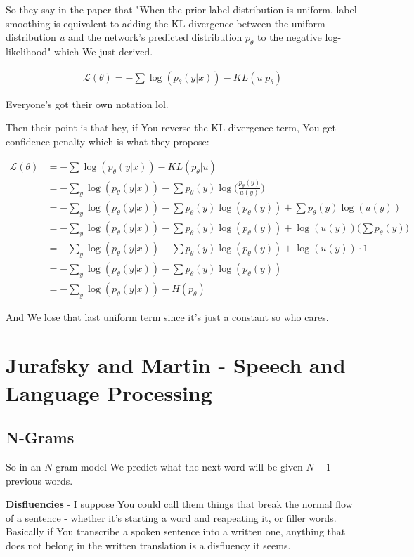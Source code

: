 \documentclass{article}
\begin{document}
		So they say in the paper that "When the prior
label distribution is uniform, label smoothing is equivalent to adding the KL divergence between the
uniform distribution $u$ and the network's predicted distribution $p_\theta$ to the negative log-likelihood" which We just derived.

		\begin{align}
			\mathcal{L}(\theta) = -\sum\log(p_\theta(y|x)) - KL(u|p_\theta)
		\end{align}
		
		Everyone's got their own notation lol.
		
		Then their point is that hey, if You reverse the KL divergence term, You get confidence penalty which is what they propose:
		
		\begin{align}
			\mathcal{L}(\theta) &= -\sum\log(p_\theta(y|x)) - KL(p_\theta | u)\\
			&= -\sum_y \log(p_\theta(y|x)) - \sum p_\theta(y) \log\bigg(\frac{p_\theta(y)}{u(y)} \bigg)\\
			&= -\sum_y \log(p_\theta(y|x)) - \sum p_\theta(y) \log(p_\theta(y)) + \sum p_\theta(y) \log(u(y))\\
			&= -\sum_y \log(p_\theta(y|x)) - \sum p_\theta(y) \log(p_\theta(y)) + \log(u(y))\bigg(\sum p_\theta(y)\bigg) \\
			&= -\sum_y \log(p_\theta(y|x)) - \sum p_\theta(y) \log(p_\theta(y)) + \log(u(y))\cdot 1\\
			&= -\sum_y \log(p_\theta(y|x)) - \sum p_\theta(y) \log(p_\theta(y))\\
			&= -\sum_y \log(p_\theta(y|x)) - H(p_\theta)
		\end{align}
		
		And We lose that last uniform term since it's just a constant so who cares.


\newpage		
\section{Jurafsky and Martin - Speech and Language Processing}

	\subsection{N-Grams}
	
		So in an $N$-gram model We predict what the next word will be given $N-1$ previous words.


		\textbf{Disfluencies} - I suppose You could call them things that break the normal flow of a sentence - whether it's starting a word and reapeating it, or filler words. Basically if You transcribe a spoken sentence into a written one, anything that does not belong in the written translation is a disfluency it seems.
		
\end{document}
